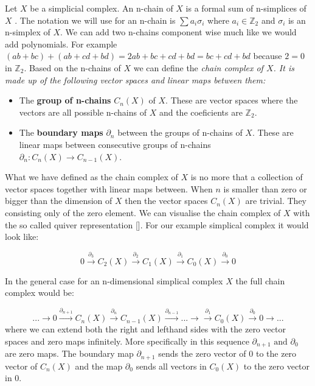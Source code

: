 Let $X$ be a simplicial complex. An n-chain of $X$ is a formal sum of n-simplices of $X$ \cite{comp-topo}. The notation we will use for an n-chain is $\sum{a_i \sigma_i}$ where $a_i \in \mathbb{Z}_2$ and $\sigma_i$ is an n-simplex of $X$. We can add two n-chains component wise much like we would add polynomials. For example $(ab + bc) + (ab + cd + bd) = 2ab + bc + cd + bd = bc + cd + bd$ because $2 = 0$ in $\mathbb{Z}_2$. Based on the n-chains of $X$ we can define the \em chain complex \em of $X$. It is made up of the following vector spaces and linear maps between them:


\begin{itemize}

    \item The \textbf{group of n-chains} $C_n(X)$ of $X$. These are vector spaces where the vectors are all possible n-chains of $X$ and the coeficients are $\mathbb{Z}_2$.

    \item The \textbf{boundary maps} $\partial_n$ between the groups of n-chains of $X$. These are linear maps between consecutive groups of n-chains $\partial_n : C_n(X) \to C_{n-1}(X)$.

\end{itemize}

What we have defined as the chain complex of $X$ is no more that a collection of vector spaces together with linear maps between. When $n$ is smaller than zero or bigger than the dimension of $X$ then the vector spaces $C_n(X)$ are trivial. They consisting only of the zero element. We can visualise the chain complex of $X$ with the so called quiver representation []. For our example simplical complex it would look like:

$$ 0 \overset{\partial_{3}}{\longrightarrow} C_2(X) \overset{\partial_{2}}{\longrightarrow} C_{1}(X) \overset{\partial_{1}}{\longrightarrow} C_{0}(X) \overset{\partial_0}{\longrightarrow}  0 $$

In the general case for an n-dimensional simplical complex $X$ the full chain complex would be:

$$ ... \longrightarrow 0 \overset{\partial_{n+1}}{\longrightarrow} C_n(X) \overset{\partial_{n}}{\longrightarrow} C_{n-1}(X) \overset{\partial_{n-1}}{\longrightarrow} ... \longrightarrow  \overset{\partial_1}{\longrightarrow} C_0(X) \overset{\partial_0}{\longrightarrow} 0 \longrightarrow ... $$
where we can extend both the right and lefthand sides with the zero vector spaces and zero maps infinitely. More specifically in this sequence $\partial_{n+1} \text{ and } \partial_{0}$ are zero maps. The boundary map $\partial_{n+1}$ sends the zero vector of $0$ to the zero vector of $C_n(X)$ and the map $\partial_0$ sends all vectors in $C_0(X)$ to the zero vector in $0$.

